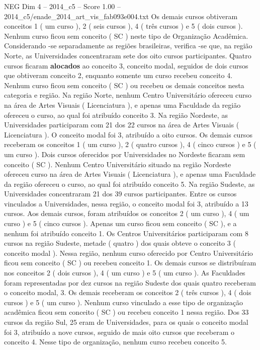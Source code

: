 \begin{textsample}{NEG Dim 4 – 2014\_c5 – Score 1.00 – 2014\_c5/enade\_2014\_art\_vis\_fab093e004.txt}
Os demais cursos obtiveram conceitos 1 ( um curso ), 2 ( seis cursos ), 4 ( três cursos ) e 5 ( dois cursos ).
Nenhum curso ficou sem conceito ( SC ) neste tipo de Organização Acadêmica.
Considerando -se separadamente as regiões brasileiras, verifica -se que, na região Norte, as Universidades concentraram sete dos oito cursos participantes.
Quatro cursos ficaram \textbf{alocados} ao conceito 3, conceito modal, seguidos de dois cursos que obtiveram conceito 2, enquanto somente um curso recebeu conceito 4.
Nenhum curso ficou sem conceito ( SC ) ou recebeu os demais conceitos nesta categoria e região.
Na região Norte, nenhum Centro Universitário ofereceu curso na área de Artes Visuais ( Licenciatura ), e apenas uma Faculdade da região ofereceu o curso, ao qual foi atribuído conceito 3.
Na região Nordeste, as Universidades participaram com 21 dos 22 cursos na área de Artes Visuais ( Licenciatura ).
O conceito modal foi 3, atribuído a oito cursos.
Os demais cursos receberam os conceitos 1 ( um curso ), 2 ( quatro cursos ), 4 ( cinco cursos ) e 5 ( um curso ).
Dois cursos oferecidos por Universidades no Nordeste ficaram sem conceito ( SC ).
Nenhum Centro Universitário situado na região Nordeste ofereceu curso na área de Artes Visuais ( Licenciatura ), e apenas uma Faculdade da região ofereceu o curso, ao qual foi atribuído conceito 5.
Na região Sudeste, as Universidades concentraram 21 dos 39 cursos participantes.
Entre os cursos vinculados a Universidades, nessa região, o conceito modal foi 3, atribuído a 13 cursos.
Aos demais cursos, foram atribuídos os conceitos 2 ( um curso ), 4 ( um curso ) e 5 ( cinco cursos ).
Apenas um curso ficou sem conceito ( SC ), e a nenhum foi atribuído conceito 1.
Os Centros Universitários participaram com 8 cursos na região Sudeste, metade ( quatro ) dos quais obteve o conceito 3 ( conceito modal ).
Nessa região, nenhum curso oferecido por Centro Universitário ficou sem conceito ( SC ) ou recebeu conceito 1.
Os demais cursos se distribuíram nos conceitos 2 ( dois cursos ), 4 ( um curso ) e 5 ( um curso ).
As Faculdades foram representadas por dez cursos na região Sudeste dos quais quatro receberam o conceito modal, 3.
Os demais receberam os conceitos 2 ( três cursos ), 4 ( dois cursos ) e 5 ( um curso ).
Nenhum curso vinculado a esse tipo de organização acadêmica ficou sem conceito ( SC ) ou recebeu conceito 1 nessa região.
Dos 33 cursos da região Sul, 25 eram de Universidades, para os quais o conceito modal foi 3, atribuído a nove cursos, seguido de mais oito cursos que receberam o conceito 4.
Nesse tipo de organização, nenhum curso recebeu conceito 5.

\end{textsample}
